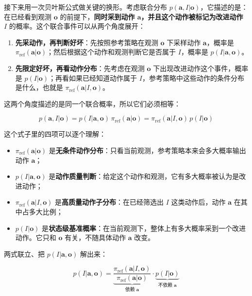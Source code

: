 \documentclass[
  chinese,
]{ctexart}
\providecommand{\tightlist}{%
  \setlength{\itemsep}{0pt}\setlength{\parskip}{0pt}}
\begin{document}
接下来用一次贝叶斯公式做关键的换形。考虑联合分布
\(p(\mathbf{a}, I | \mathbf{o})\)，它描述的是：在已经看到观测
\(\mathbf{o}\) 的前提下，\textbf{同时采到动作
\(\mathbf{a}\)，并且这个动作被标记为改进动作 \(I\)}
的概率。这个联合事件可以从两个角度展开：

\begin{enumerate}
\def\labelenumi{\arabic{enumi}.}
\tightlist
\item
  \textbf{先采动作，再判断好坏}：先按照参考策略在观测 \(\mathbf{o}\)
  下采样动作 \(\mathbf{a}\)，概率是
  \(\pi_\text{ref}(\mathbf{a}|\mathbf{o})\)；然后根据这个动作和观测判断它是否属于
  \(I\)，概率是 \(p(I|\mathbf{a},\mathbf{o})\)。
\item
  \textbf{先限定好坏，再看动作分布}：先考虑在观测 \(\mathbf{o}\)
  下出现改进动作这个事件，概率是
  \(p(I|\mathbf{o})\)；再看如果已经知道动作属于
  \(I\)，参考策略中这些动作的条件分布是什么，也就是
  \(\pi_\text{ref}(\mathbf{a}|I,\mathbf{o})\)。
\end{enumerate}

这两个角度描述的是同一个联合概率，所以它们必须相等：

\[
p(\mathbf{a}, I | \mathbf{o}) = p(I | \mathbf{a}, \mathbf{o}) \, \pi_\text{ref}(\mathbf{a} | \mathbf{o}) = \pi_\text{ref}(\mathbf{a} | I, \mathbf{o}) \, p(I | \mathbf{o})
\]

这个式子里的四项可以逐个理解：

\begin{itemize}
\tightlist
\item
  \(\pi_\text{ref}(\mathbf{a}|\mathbf{o})\)
  是\textbf{无条件动作分布}：只看当前观测，参考策略本来会多大概率输出动作
  \(\mathbf{a}\)；
\item
  \(p(I|\mathbf{a},\mathbf{o})\)
  是\textbf{动作质量判断}：给定这个动作和观测，它有多大概率被认为是改进动作；
\item
  \(\pi_\text{ref}(\mathbf{a}|I,\mathbf{o})\)
  是\textbf{高质量动作子分布}：在已经筛选出 \(I\) 这类动作后，动作
  \(\mathbf{a}\) 在其中占多大比例；
\item
  \(p(I|\mathbf{o})\)
  是\textbf{状态级基准概率}：在当前观测下，整体上有多大概率采到一个改进动作。它只和
  \(\mathbf{o}\) 有关，不随具体动作 \(\mathbf{a}\) 改变。
\end{itemize}

两式联立、把 \(p(I|\mathbf{a},\mathbf{o})\) 解出来：

\[
p(I | \mathbf{a}, \mathbf{o}) = \underbrace{\frac{\pi_\text{ref}(\mathbf{a} | I, \mathbf{o})}{\pi_\text{ref}(\mathbf{a} | \mathbf{o})}}_{\text{依赖 } \mathbf{a}} \cdot \underbrace{p(I | \mathbf{o})}_{\text{不依赖 } \mathbf{a}}
\]
\end{document}

